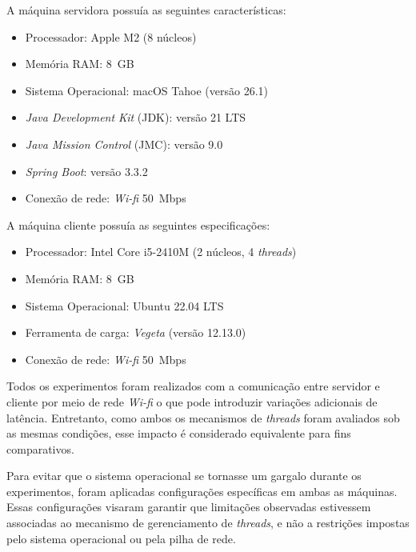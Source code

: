 \documentclass[12pt, openright, oneside, a4paper, english,	french,	spanish, brazil	]{abntex2}
\begin{document}
    A máquina servidora possuía as seguintes características:

    \begin{itemize}
        \item Processador: Apple M2 (8 núcleos)
        \item Memória RAM: 8~GB
        \item Sistema Operacional: macOS Tahoe (versão 26.1)
        \item \textit{Java Development Kit} (JDK): versão 21 LTS
        \item \textit{Java Mission Control} (JMC): versão 9.0
        \item \textit{Spring Boot}: versão 3.3.2 
        \item Conexão de rede: \textit{Wi-fi} 50~Mbps
    \end{itemize}

    A máquina cliente possuía as seguintes especificações:

    \begin{itemize}
    \item Processador: Intel Core i5-2410M (2 núcleos, 4 \textit{threads})
    \item Memória RAM: 8~GB
    \item Sistema Operacional: Ubuntu 22.04 LTS
    \item Ferramenta de carga: \textit{Vegeta} (versão 12.13.0)
    \item Conexão de rede: \textit{Wi-fi} 50~Mbps
    \end{itemize}

    Todos os experimentos foram realizados com a comunicação entre servidor e cliente por meio de rede \textit{Wi-fi} o que pode introduzir variações adicionais de latência. Entretanto, como ambos os mecanismos de \textit{threads} foram avaliados sob as mesmas condições, esse impacto é considerado equivalente para fins comparativos.

    Para evitar que o sistema operacional se tornasse um gargalo durante os experimentos, foram aplicadas configurações específicas em ambas as máquinas. Essas configurações visaram garantir que limitações observadas estivessem associadas ao mecanismo de gerenciamento de \textit{threads}, e não a restrições impostas pelo sistema operacional ou pela pilha de rede.
\end{document}
